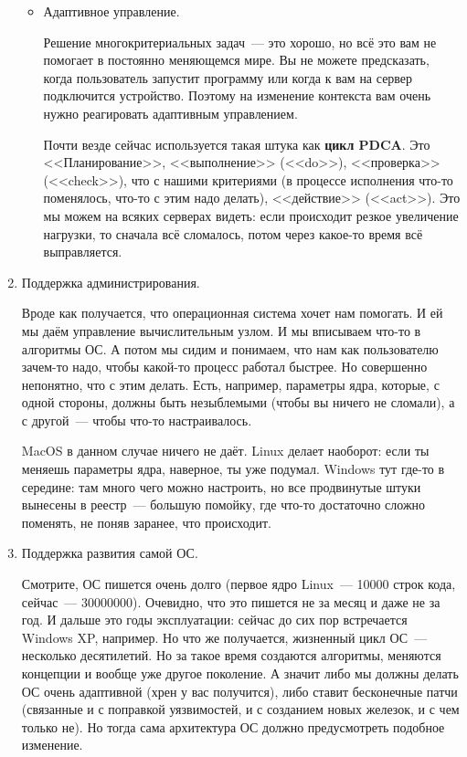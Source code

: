 \documentclass{article}
\begin{document}
\begin{enumerate}
\begin{itemize}
            \item Адаптивное управление.
            
            Решение многокритериальных задач~--- это хорошо, но всё это вам не помогает в постоянно меняющемся мире. Вы не можете предсказать, когда пользователь запустит программу или когда к вам на сервер подключится устройство. Поэтому на изменение контекста вам очень нужно реагировать адаптивным управлением.
            
            Почти везде сейчас используется такая штука как \textbf{цикл PDCA}. Это <<Планирование>>, <<выполнение>> (<<do>>), <<проверка>> (<<check>>), что с нашими критериями (в процессе исполнения что-то поменялось, что-то с этим надо делать), <<действие>> (<<act>>). Это мы можем на всяких серверах видеть: если происходит резкое увеличение нагрузки, то сначала всё сломалось, потом через какое-то время всё выправляется.
        \end{itemize}
        \item Поддержка администрирования.
        
        Вроде как получается, что операционная система хочет нам помогать. И ей мы даём управление вычислительным узлом. И мы вписываем что-то в алгоритмы ОС. А потом мы сидим и понимаем, что нам как пользователю зачем-то надо, чтобы какой-то процесс работал быстрее. Но совершенно непонятно, что с этим делать. Есть, например, параметры ядра, которые, с одной стороны, должны быть незыблемыми (чтобы вы ничего не сломали), а с другой~--- чтобы что-то настраивалось.
        
        MacOS в данном случае ничего не даёт. Linux делает наоборот: если ты меняешь параметры ядра, наверное, ты уже подумал. Windows тут где-то в середине: там много чего можно настроить, но все продвинутые штуки вынесены в реестр~--- большую помойку, где что-то достаточно сложно поменять, не поняв заранее, что происходит.
        
        \item Поддержка развития самой ОС.
        
        Смотрите, ОС пишется очень долго (первое ядро Linux~--- 10000 строк кода, сейчас~--- 30000000). Очевидно, что это пишется не за месяц и даже не за год. И дальше это годы эксплуатации: сейчас до сих пор встречается Windows XP, например. Но что же получается, жизненный цикл ОС~--- несколько десятилетий. Но за такое время создаются алгоритмы, меняются концепции и вообще уже другое поколение. А значит либо мы должны делать ОС очень адаптивной (хрен у вас получится), либо ставит бесконечные патчи (связанные и с поправкой уязвимостей, и с созданием новых железок, и с чем только не). Но тогда сама архитектура ОС должно предусмотреть подобное изменение.
    \end{enumerate}
\end{document}
